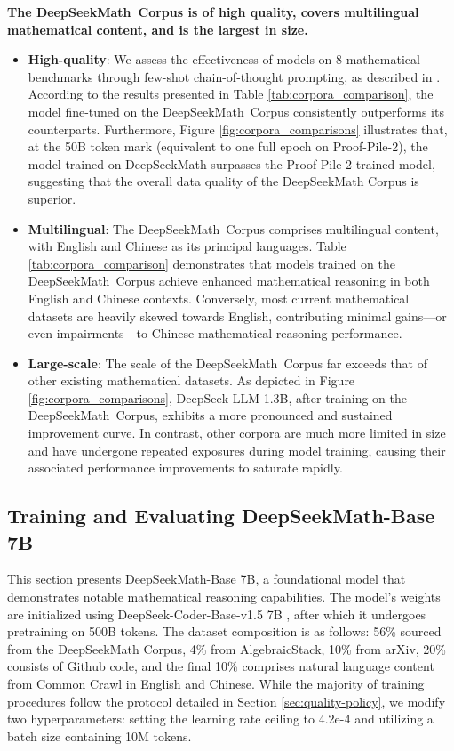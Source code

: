 \begin{itemize}[topsep=0pt]
\textbf{The DeepSeekMath~Corpus is of high quality, covers multilingual mathematical content, and is the largest in size.}

\begin{itemize}[topsep=0pt]
    \item \textbf{High-quality}:
    We assess the effectiveness of models on 8 mathematical benchmarks through few-shot chain-of-thought prompting, as described in \cite{cot}. According to the results presented in Table \ref{tab:corpora_comparison}, the model fine-tuned on the DeepSeekMath~Corpus consistently outperforms its counterparts. Furthermore, Figure \ref{fig:corpora_comparisons} illustrates that, at the 50B token mark (equivalent to one full epoch on Proof-Pile-2), the model trained on DeepSeekMath surpasses the Proof-Pile-2-trained model, suggesting that the overall data quality of the DeepSeekMath Corpus is superior.
    \item \textbf{Multilingual}:
    The DeepSeekMath~Corpus comprises multilingual content, with English and Chinese as its principal languages. Table \ref{tab:corpora_comparison} demonstrates that models trained on the DeepSeekMath~Corpus achieve enhanced mathematical reasoning in both English and Chinese contexts. Conversely, most current mathematical datasets are heavily skewed towards English, contributing minimal gains—or even impairments—to Chinese mathematical reasoning performance.
    \item \textbf{Large-scale}:
    The scale of the DeepSeekMath~Corpus far exceeds that of other existing mathematical datasets. As depicted in Figure \ref{fig:corpora_comparisons}, DeepSeek-LLM 1.3B, after training on the DeepSeekMath~Corpus, exhibits a more pronounced and sustained improvement curve. In contrast, other corpora are much more limited in size and have undergone repeated exposures during model training, causing their associated performance improvements to saturate rapidly.
\end{itemize}

\subsection{Training and Evaluating DeepSeekMath-Base 7B}

This section presents DeepSeekMath-Base 7B, a foundational model that demonstrates notable mathematical reasoning capabilities. The model's weights are initialized using DeepSeek-Coder-Base-v1.5 7B \citep{deepseek-coder}, after which it undergoes pretraining on 500B tokens. The dataset composition is as follows: 56\% sourced from the DeepSeekMath Corpus, 4\% from AlgebraicStack, 10\% from arXiv, 20\% consists of Github code, and the final 10\% comprises natural language content from Common Crawl in English and Chinese. While the majority of training procedures follow the protocol detailed in Section \ref{sec:quality-policy}, we modify two hyperparameters: setting the learning rate ceiling to 4.2e-4 and utilizing a batch size containing 10M tokens.


\end{itemize}
